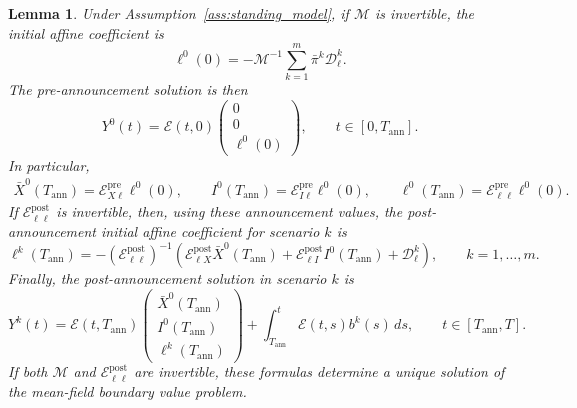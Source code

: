 \documentclass[10pt,a4paper]{amsart}
\newtheorem{lemma}{Lemma}
\begin{document}
\begin{lemma}
\label{lem:mf_state_transition_representation}
Under Assumption~\ref{ass:standing_model}, if \(\mathcal M\) is invertible,
the initial affine coefficient is
\begin{equation}\label{eq:mf_pre_matching}
\ell^0(0)
=
-\mathcal M^{-1}\sum_{k=1}^m\bar\pi^k\mathcal D_\ell^k.
\end{equation}
The pre-announcement solution is then
\begin{equation}\label{eq:mf_pre_forward_solution}
Y^0(t)
=
\mathcal E(t,0)
\begin{pmatrix}
0\\
0\\
\ell^0(0)
\end{pmatrix},
\qquad
t\in[0,T_{\mathrm{ann}}].
\end{equation}
In particular,
\[
\begin{aligned}
\bar X^0(T_{\mathrm{ann}})
=\mathcal E^{\mathrm{pre}}_{X\ell}\ell^0(0),
\qquad
I^0(T_{\mathrm{ann}})
=\mathcal E^{\mathrm{pre}}_{I\ell}\ell^0(0),
\qquad
\ell^0(T_{\mathrm{ann}})
=\mathcal E^{\mathrm{pre}}_{\ell\ell}\ell^0(0).
\end{aligned}
\]
If \(\mathcal E^{\mathrm{post}}_{\ell\ell}\) is invertible, then, using these
announcement values, the post-announcement initial affine coefficient for
scenario \(k\) is
\begin{equation}\label{eq:mf_post_transition_ell}
\ell^k(T_{\mathrm{ann}})
=
-(\mathcal E^{\mathrm{post}}_{\ell\ell})^{-1}
\left(\mathcal E^{\mathrm{post}}_{\ell X}\bar X^0(T_{\mathrm{ann}})+
\mathcal E^{\mathrm{post}}_{\ell I}I^0(T_{\mathrm{ann}})+\mathcal D_\ell^k\right),
\qquad k=1,\ldots,m.
\end{equation}
Finally, the post-announcement solution in scenario \(k\) is
\begin{equation}\label{eq:mf_post_forward_solution}
Y^k(t)
=
\mathcal E(t,T_{\mathrm{ann}})
\begin{pmatrix}
\bar X^0(T_{\mathrm{ann}})\\
I^0(T_{\mathrm{ann}})\\
\ell^k(T_{\mathrm{ann}})
\end{pmatrix}
+
\int_{T_{\mathrm{ann}}}^t
\mathcal E(t,s)b^k(s)\,ds,
\qquad
t\in[T_{\mathrm{ann}},T].
\end{equation}
If both \(\mathcal M\) and \(\mathcal E^{\mathrm{post}}_{\ell\ell}\) are
invertible, these formulas determine a unique solution of the mean-field
boundary value problem.
\end{lemma}
\end{document}
